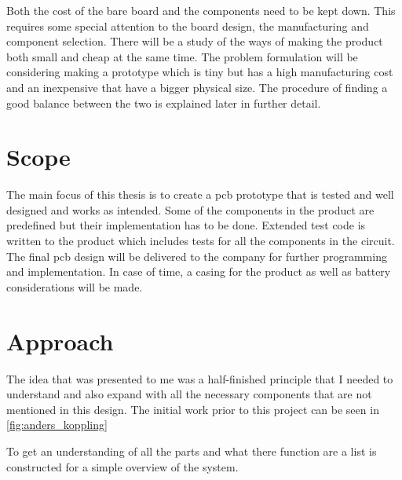 Both the cost of the bare board and the components need to be kept down.  This requires some special attention to the board design, the manufacturing and component selection.
There will be a study of the ways of making the product both small and cheap at the same time. The problem formulation will be considering making a prototype which is tiny but has a high manufacturing cost and an inexpensive that have a bigger physical size. The procedure of finding a good balance between the two is explained later in further detail.

\section{Scope}
The main focus of this thesis is to create a \gls{pcb} prototype that is tested and well designed and works as intended. Some of the components in the product are predefined but their implementation has to be done.
Extended test code is written to the product which includes tests for all the components in the circuit.  
The final \gls{pcb} design will be delivered to the company for further programming and implementation.
In case of time, a casing for the product as well as battery considerations will be made.

\newpage
\section{Approach}
The idea that was presented to me was a half-finished principle that I needed to understand and also expand with all the necessary components that are not mentioned in this design. The initial work prior to this project can be seen in \autoref{fig:anders_koppling}


To get an understanding of all the parts and what there function are a list is constructed for a simple overview of the system.

